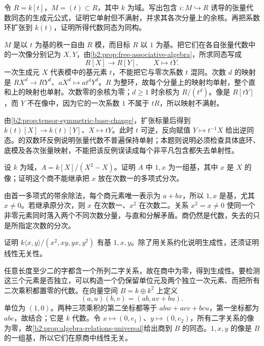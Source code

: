 \begin{exercise}\label{b2:ex:08-tensor-algebra-injection-failure}
	令 \(R=k[t]\)，\(M=(t)\subset R\)，其中 \(k\) 为域。写出包含 \(i:M\hookrightarrow R\) 诱导的张量代数同态的生成元公式，证明它单射但不满射，并求其各次分量上的余核。再把系数环扩张到 \(k(t)\)，证明所得代数同态为同构。
\end{exercise}
\begin{solution}
	\(M\) 是以 \(t\) 为基的秩一自由 \(R\) 模，而目标 \(R\) 以 \(1\) 为基。把它们在各自张量代数中的一次像分别记为 \(X,Y\)，由\cref{b2:prop:free-associative-algebra}，所求同态写成
	\[
		R[X]\longrightarrow R[Y],\qquad X\longmapsto tY.
	\]
	一次生成元 \(X\) 代表模中的基元素 \(t\)，不能把它与零次系数 \(t\) 混同。次数 \(d\) 的映射是 \(RX^d\to RY^d\)、\(aX^d\mapsto at^dY^d\)。\(R\) 为整环，故每个分量上的映射均单射，整个直和上的映射也单射。次数零的余核为零；\(d\ge1\) 时余核为 \(R/(t^d)\)。像是 \(R[tY]\)，而 \(Y\) 不在像中，因为它的一次系数 \(1\) 不属于 \(tR\)，所以映射不满射。

	由\cref{b2:prop:tensor-symmetric-base-change}，扩张标量后得到 \(k(t)[X]\to k(t)[Y]\)、\(X\mapsto tY\)。此时 \(t\) 可逆，反向赋值 \(Y\mapsto t^{-1}X\) 给出逆同态。的双数环反例说明张量代数不普遍保持单射；本题则说明必须检查具体底环、底模及各次张量映射，不能把该反例误读成每个非平凡包含都失去单射性。
\end{solution}

\begin{exercise}\label{b2:ex:08-inhomogeneous-relation}
	设 \(k\) 为域，\(A=k[X]/(X^2-X)\)。证明 \(A\) 中 \(1,x\) 为一组基，其中 \(x\) 是 \(X\) 的像；证明这个商不能继承把 \(x\) 放在次数一的多项式分次。
\end{exercise}
\begin{solution}
	由首一多项式的带余除法，每个商元素唯一表示为 \(a+bx\)，所以 \(1,x\) 是基，尤其 \(x\ne0\)。若继承原分次，则 \(x\) 在次数一、\(x^2\) 在次数二。关系 \(x^2=x\ne0\) 使同一个非零元素同时落入两个不同次数分量，与直和分解矛盾。商仍然是代数，失去的只是所指定次数的分次。
\end{solution}

\begin{exercise}\label{b2:ex:08-square-zero-algebra}
	证明 \(k\langle x,y\rangle/(x^2,xy,yx,y^2)\) 有基 \(1,x,y\)。除了用关系约化说明生成性，还须证明线性无关性。
\end{exercise}
\begin{solution}
	任意长度至少二的字都含一个所列二字关系，故在商中为零，得到生成性。要检测这三个元素是否独立，可以构造一个仍保留单位元及两个独立一次元素、而把所有二次乘积都置零的代数。在向量空间 \(B=k\oplus k^2\) 上定义
	\[
		(a,u)(b,v)=(ab,av+bu).
	\]
	单位为 \((1,0)\)。两种三项乘积的第二坐标都等于 \(ab w+ac v+bc u\)，第一坐标都为 \(abc\)，故结合；它是 \(k\) 代数。令 \(x\mapsto(0,e_1)\)、\(y\mapsto(0,e_2)\)，所有二字关系的像为零，故\cref{b2:prop:algebra-relations-universal}给出商到 \(B\) 的同态。\(1,x,y\) 的像是 \(B\) 的一组基，所以它们在原商中线性无关。
\end{solution}


